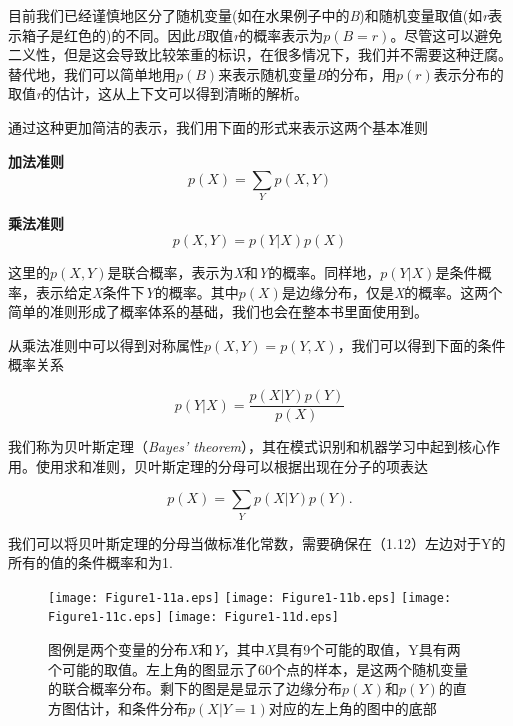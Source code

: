 	目前我们已经谨慎地区分了随机变量(如在水果例子中的\textit{B})和随机变量取值(如\textit{r}表示箱子是红色的)的不同。因此\textit{B}取值\textit{r}的概率表示为$p(B = r)$。尽管这可以避免二义性，但是这会导致比较笨重的标识，在很多情况下，我们并不需要这种迂腐。替代地，我们可以简单地用$p(B)$来表示随机变量\textit{B}的分布，用$p(r)$表示分布的取值\textit{r}的估计，这从上下文可以得到清晰的解析。
	
	通过这种更加简洁的表示，我们用下面的形式来表示这两个基本准则
	
	{\color{red}{概率的准则}}
	
	\textbf{加法准则}
			\begin{equation}
			 p(X) = \sum_Y p(X,Y)
			\end{equation}
	
	\textbf{乘法准则}
			\begin{equation}
			 p(X,Y) = p(Y|X)p(X)
			\end{equation} 

	这里的$p(X, Y)$是联合概率，表示为\textit{X}和\textit{Y}的概率。同样地，$p(Y|X)$是条件概率，表示给定\textit{X}条件下\textit{Y}的概率。其中$p(X)$是边缘分布，仅是\textit{X}的概率。这两个简单的准则形成了概率体系的基础，我们也会在整本书里面使用到。
	
	从乘法准则中可以得到对称属性$p(X, Y) = p(Y, X)$，我们可以得到下面的条件概率关系
	
	\begin{equation}
	p(Y|X) = \frac{p(X|Y)p(Y)}{p(X)}
	\end{equation}
	
	我们称为贝叶斯定理（\textit{Bayes' theorem}），其在模式识别和机器学习中起到核心作用。使用求和准则，贝叶斯定理的分母可以根据出现在分子的项表达
	
	\begin{equation}
	p(X) = \sum_Y p(X|Y)p(Y).
	\end{equation}
	
	我们可以将贝叶斯定理的分母当做标准化常数，需要确保在（1.12）左边对于Y的所有的值的条件概率和为1.
	
	\begin{figure}[t]
		\texttt{[image: Figure1-11a.eps]}
		\texttt{[image: Figure1-11b.eps]}
		\texttt{[image: Figure1-11c.eps]}
		\texttt{[image: Figure1-11d.eps]}
		\caption{图例是两个变量的分布\textit{X}和\textit{Y}，其中\textit{X}具有9个可能的取值，Y具有两个可能的取值。左上角的图显示了60个点的样本，是这两个随机变量的联合概率分布。剩下的图是是显示了边缘分布$p(X)$和$p(Y)$的直方图估计，和条件分布$p(X|Y = 1)$对应的左上角的图中的底部}
	\end{figure}
	
